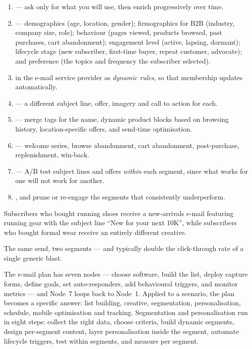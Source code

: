 \begin{enumerate}
\item {} --- ask only for what you will use,
      then enrich progressively over time.
\item {} --- demographics (age, location,
      gender); firmographics for B2B (industry, company size, role); behaviour
      (pages viewed, products browsed, past purchases, cart abandonment);
      engagement level (active, lapsing, dormant); lifecycle stage (new
      subscriber, first-time buyer, repeat customer, advocate); and preference
      (the topics and frequency the subscriber selected).
\item {} in the e-mail service provider as \emph{dynamic
      rules}, so that membership updates automatically.
\item {} --- a different subject line, offer,
      imagery and call to action for each.
\item {} --- merge tags for the name,
      dynamic product blocks based on browsing history, location-specific offers,
      and send-time optimisation.
\item {} --- welcome series, browse abandonment,
      cart abandonment, post-purchase, replenishment, win-back.
\item {} --- A/B test subject lines and offers \emph{within} each
      segment, since what works for one will not work for another.
\item {}, and prune or re-engage the segments that
      consistently underperform.
\end{enumerate}

\begin{examplebox}
Subscribers who bought running shoes receive a new-arrivals e-mail featuring
running gear with the subject line ``New for your next 10K'', while subscribers
who bought formal wear receive an entirely different creative.

\smallskip
The same send, two segments --- and typically double the click-through rate of a
single generic blast.
\end{examplebox}

\begin{summarybox}
The e-mail plan has seven nodes --- choose software, build the list, deploy
capture forms, define goals, set auto-responders, add behavioural triggers, and
monitor metrics --- and Node~7 loops back to Node~1. Applied to a scenario, the
plan becomes a specific answer: list building, creative, segmentation,
personalisation, schedule, mobile optimisation and tracking. Segmentation and
personalisation run in eight steps: collect the right data, choose criteria,
build dynamic segments, design per-segment content, layer personalisation inside
the segment, automate lifecycle triggers, test within segments, and measure per
segment.
\end{summarybox}

